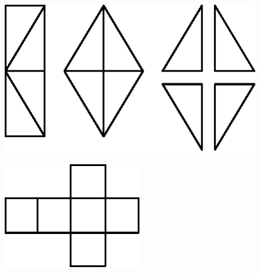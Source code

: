 \begin{figure}[H]
\centering
\includegraphics{figure/fig_07.eps}
\caption{}\label{chap6-fig7}
\end{figure}

\begin{figure}[H]
\centering
\includegraphics{figure/fig_08.eps}
\caption{}\label{chap6-fig8}
\end{figure}

\vfill\eject

